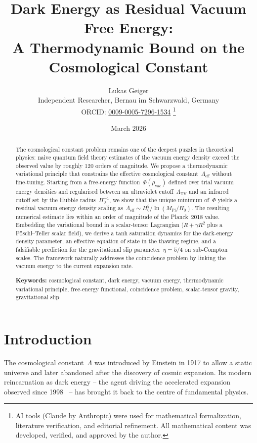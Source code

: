 \documentclass[12pt,a4paper]{article}
\title{\textbf{Dark Energy as Residual Vacuum Free Energy:\\[4pt]
A Thermodynamic Bound on the Cosmological Constant}}
\author{Lukas Geiger\\[2pt]
\small Independent Researcher, Bernau im Schwarzwald, Germany\\[2pt]
\small ORCID: \href{https://orcid.org/0009-0005-7296-1534}{0009-0005-7296-1534}%
\thanks{AI tools (Claude by Anthropic) were used for mathematical formalization, literature verification, and editorial refinement. All mathematical content was developed, verified, and approved by the author.}}
\date{March 2026}
\theoremstyle{definition}
\theoremstyle{plain}
\theoremstyle{remark}
\newcommand{\Leff}{\Lambda_{\mathrm{eff}}}
\newcommand{\LUV}{\Lambda_{\mathrm{UV}}}
\newcommand{\rhov}{\rho_{\mathrm{vac}}}
\begin{document}
\maketitle

\begin{abstract}
The cosmological constant problem remains one of the deepest puzzles in
theoretical physics: naive quantum field theory estimates of the vacuum
energy density exceed the observed value by roughly 120 orders of
magnitude. We propose a thermodynamic variational principle that
constrains the effective cosmological constant~$\Leff$ without fine-tuning.
Starting from a free-energy function~$\Phi(\rhov)$ defined over trial
vacuum energy densities and regularised between an ultraviolet
cutoff~$\LUV$ and an infrared cutoff set by the Hubble radius~$H_0^{-1}$,
we show that the unique minimum of~$\Phi$ yields a residual vacuum
energy density scaling as~$\Leff \sim H_0^{2}/\ln(M_{\mathrm{Pl}}/H_0)$.
The resulting numerical estimate lies within an order of magnitude of the
Planck~2018 value.  Embedding the variational bound in a scalar-tensor
Lagrangian ($R + \gamma R^{2}$ plus a P\"oschl--Teller scalar field), we
derive a tanh saturation dynamics for the dark-energy density parameter,
an effective equation of state in the thawing regime, and a falsifiable
prediction for the gravitational slip parameter~$\eta = 5/4$ on
sub-Compton scales.  The framework naturally addresses the coincidence
problem by linking the vacuum energy to the current expansion rate.

\medskip\noindent
\textbf{Keywords:} cosmological constant, dark energy, vacuum energy,
thermodynamic variational principle, free-energy functional, coincidence
problem, scalar-tensor gravity, gravitational slip
\end{abstract}

\section{Introduction}\label{sec:intro}

The cosmological constant~$\Lambda$ was introduced by Einstein in 1917 to
allow a static universe and later abandoned after the discovery of cosmic
expansion. Its modern reincarnation as dark energy -- the agent driving
the accelerated expansion observed since
1998~\cite{Riess1998,Perlmutter1999} -- has brought it back to the
centre of fundamental physics.
\end{document}
